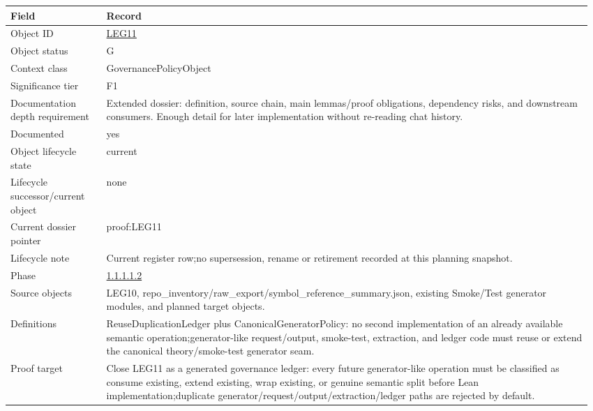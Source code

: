 \begin{longtable}{L{0.16\linewidth} L{0.81\linewidth}}
\hline
\textbf{Field} & \textbf{Record}\\
\hline
Object ID & \hyperlink{object-row-LEG11}{LEG11}\\
\hline\addlinespace[0.20em]
Object status & G\\
\hline\addlinespace[0.20em]
Context class & GovernancePolicyObject\\
\hline\addlinespace[0.20em]
Significance tier & F1\\
\hline\addlinespace[0.20em]
Documentation depth requirement & Extended dossier: definition, source chain, main lemmas/\allowbreak{}proof obligations, dependency risks, and downstream consumers. Enough detail for later implementation without re-reading chat history.\\
\hline\addlinespace[0.20em]
Documented & yes\\
\hline\addlinespace[0.20em]
Object lifecycle state & current\\
\hline\addlinespace[0.20em]
Lifecycle successor/\allowbreak{}current object & none\\
\hline\addlinespace[0.20em]
Current dossier pointer & proof:LEG11\\
\hline\addlinespace[0.20em]
Lifecycle note & Current register row;\newline no supersession, rename or retirement recorded at this planning snapshot.\\
\hline\addlinespace[0.20em]
Phase & \hyperlink{phase-row-1-1-1-1-2}{1.1.1.1.2}\\
\hline\addlinespace[0.20em]
Source objects & LEG10, repo\_inventory/\allowbreak{}raw\_export/\allowbreak{}symbol\_reference\_summary.json, existing Smoke/\allowbreak{}Test generator modules, and planned target objects.\\
\hline\addlinespace[0.20em]
Definitions & ReuseDuplicationLedger plus CanonicalGeneratorPolicy: no second implementation of an already available semantic operation;\newline generator-like request/\allowbreak{}output, smoke-test, extraction, and ledger code must reuse or extend the canonical theory/\allowbreak{}smoke-test generator seam.\\
\hline\addlinespace[0.20em]
Proof target & Close LEG11 as a generated governance ledger: every future generator-like operation must be classified as consume existing, extend existing, wrap existing, or genuine semantic split before Lean implementation;\newline duplicate generator/\allowbreak{}request/\allowbreak{}output/\allowbreak{}extraction/\allowbreak{}ledger paths are rejected by default.\\

\end{longtable}

